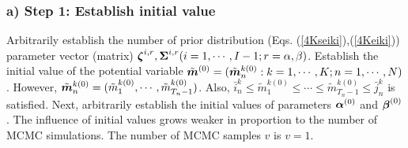 \documentclass[Journal]{ascelike}
\begin{document}
\subsubsection{a) Step 1: Establish initial value}
Arbitrarily establish the number of prior distribution (Eqs.  (\ref{4Kseiki}),(\ref{4Keiki})) parameter vector (matrix) $\mbox{\boldmath$\zeta$}^{i,r}, \mbox{\boldmath$\Sigma$}^{i,r}(i=1,\cdots,I-1;r=\alpha,\beta)$. Establish the initial value of the potential variable $\tilde{\mbox{\boldmath$m$}}^{(0)}=(\tilde{\mbox{\boldmath$m$}}_n^{k(0)}:k=1,\cdots,K;n=1,\cdots,N)$. However, $\tilde{\mbox{\boldmath$m$}}_n^{k(0)}=(\tilde{m}_1^{k(0)},\cdots,\tilde{m}_{T_n-1}^{k(0)})$. Also, $\bar{i}_n^k\leq \tilde{m}_1^{k(0)}\leq \cdots \leq \tilde{m}_{T_n-1}^{k(0)}\leq \bar{j}_n^k$ is satisfied. Next, arbitrarily establish the initial values of parameters $\mbox{\boldmath$\alpha$}^{(0)}$ and $\mbox{\boldmath$\beta$}^{(0)}$. The influence of initial values grows weaker in proportion to the number of MCMC simulations. The number of MCMC samples $v$ is $v=1$.
\end{document}

